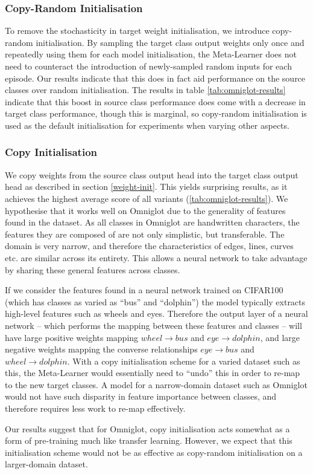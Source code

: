\documentclass{report}
\begin{document}
\subsubsection{Copy-Random Initialisation}
To remove the stochasticity in target weight initialisation, we introduce copy-random initialisation. By sampling the target class output weights only once and repeatedly using them for each model initialisation, the Meta-Learner does not need to counteract the introduction of newly-sampled random inputs for each episode. Our results indicate that this does in fact aid performance on the source classes over random initialisation. The results in table \ref{tab:omniglot-results} indicate that this boost in source class performance does come with a decrease in target class performance, though this is marginal, so copy-random initialisation is used as the default initialisation for experiments when varying other aspects.

\subsubsection{Copy Initialisation}
We copy weights from the source class output head into the target class output head as described in section \ref{weight-init}. This yields surprising results, as it achieves the highest average score of all variants (\ref{tab:omniglot-results}). We hypothesise that it works well on Omniglot due to the generality of features found in the dataset. As all classes in Omniglot are handwritten characters, the features they are composed of are not only simplistic, but transferable. The domain is very narrow, and therefore the characteristics of edges, lines, curves etc. are similar across its entirety. This allows a neural network to take advantage by sharing these general features across classes. \par
If we consider the features found in a neural network trained on CIFAR100 (which has classes as varied as ``bus'' and ``dolphin'') the model typically extracts high-level features such as wheels and eyes\parencite{deepvis}. Therefore the output layer of a neural network -- which performs the mapping between these features and classes -- will have large positive weights mapping $wheel\rightarrow bus$ and $eye\rightarrow dolphin$, and large negative weights mapping the converse relationships $eye\rightarrow bus$ and $wheel\rightarrow dolphin$. With a copy initialisation scheme for a varied dataset such as this, the Meta-Learner would essentially need to ``undo'' this in order to re-map to the new target classes. A model for a narrow-domain dataset such as Omniglot would not have such disparity in feature importance between classes, and therefore requires less work to re-map effectively. \par
Our results suggest that for Omniglot, copy initialisation acts somewhat as a form of pre-training much like transfer learning. However, we expect that this initialisation scheme would not be as effective as copy-random initialisation on a larger-domain dataset.
\end{document}
